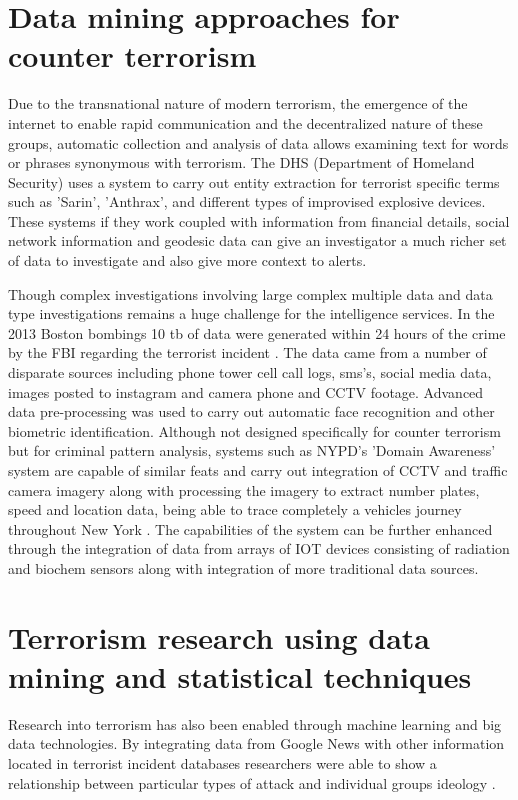 \section{Data mining approaches for counter terrorism}

Due to the transnational nature of  modern terrorism, the emergence of the internet to enable rapid communication and the decentralized nature of these groups, automatic collection and analysis of data allows examining text for words or phrases synonymous with terrorism.  The DHS (Department of Homeland Security) uses a system to carry out entity extraction for terrorist specific terms such as 'Sarin', 'Anthrax', and different types of improvised explosive devices. These systems if they work coupled with information from financial details, social network information and geodesic data can give an investigator a much richer set of data to investigate and also give more context to alerts. 

Though complex investigations involving large complex multiple data and data type investigations remains a huge challenge for the intelligence services. In the 2013 Boston bombings 10 tb of data were generated within 24 hours of the crime by the FBI regarding the terrorist incident \citep{jeberson2015survey}. The data came from a number of disparate sources including phone tower cell call logs, sms's, social media data, images posted to instagram and camera phone and CCTV footage. Advanced data pre-processing was used to carry out automatic face recognition and other biometric identification. Although not designed specifically for counter terrorism but for criminal pattern analysis, systems such as NYPD's 'Domain Awareness' system are capable of similar feats and carry out integration of CCTV and traffic camera imagery along with processing the imagery to extract number plates, speed and location data, being able to trace completely a vehicles journey throughout New York \citep{coscarelli2012nypd}. The capabilities of the system can be further enhanced through the integration of data from arrays of IOT devices consisting of radiation and biochem sensors along with integration of more traditional data sources.

\section{Terrorism research using data mining and statistical techniques}
Research into terrorism has also been enabled through machine learning and big data technologies. By integrating data from Google News with other information located in terrorist incident databases researchers were able to show a relationship between particular types of attack and individual groups ideology \citep{strang2015analyzing}.

